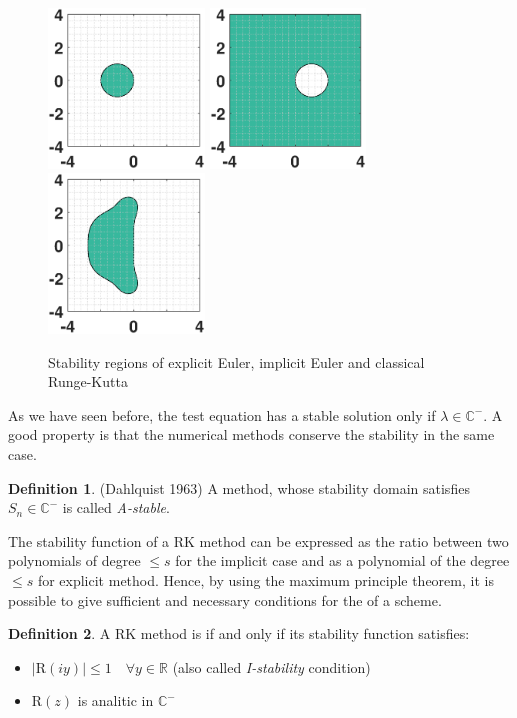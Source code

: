 \documentclass[a4paper,11pt ]{report}
\theoremstyle{definition}
\newtheorem{definition}{Definition}
\begin{document}
\begin{figure}
\includegraphics[width=4.15cm]{img/EE.eps}
\includegraphics[width=4.15cm]{img/EI.eps}
\includegraphics[width=4.15cm]{img/RK4.eps}
\caption{Stability regions of explicit Euler, implicit Euler and classical Runge-Kutta }
\end{figure}
As we have seen before, the test equation has a stable solution only if $\lambda \in \mathbb{C}^{-}$. A good property is that the numerical methods conserve the stability in the same case.
\theoremstyle{definition}
\begin{definition}{(Dahlquist 1963)}
A method, whose stability domain satisfies $S_n \in \mathbb{C}^{-}$ is called \textit{A-stable}.
\end{definition}
The stability function of a RK method can be expressed as the ratio between two polynomials of degree $\leq s$ for the implicit case and as a polynomial of the degree $\leq s$ for explicit method. Hence, by using the maximum principle theorem, it is possible to give sufficient and necessary conditions for the  of a scheme.
\theoremstyle{definition}
\begin{definition}{}
A RK method is  if and only if its stability function satisfies:
\begin{itemize}
\item $\vert\text{R}(iy)\vert \leq 1 \quad \forall y\in \mathbb{R}$ (also called \textit{I-stability} condition)
\item $\text{R}(z)$ is analitic in $\mathbb{C}^{-}$
\end{itemize}
\end{definition}{}
\end{document}
